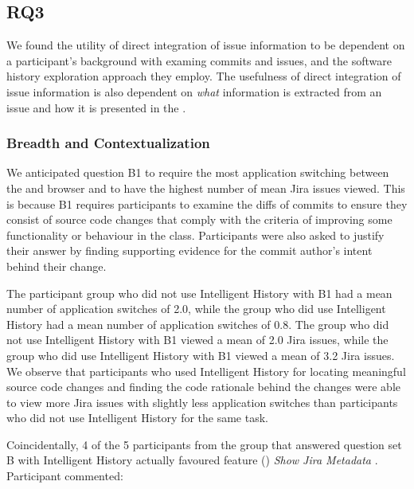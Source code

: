 
\subsection{RQ3}
\label{subsec:RQ3}


We found the utility of direct integration of issue information 
to be dependent on a participant's background with examing commits and issues,
and the software history exploration approach they employ.
The usefulness of direct integration of issue information is also dependent on 
\emph{what} information is extracted from an issue and how it is presented in the .

\subsubsection{Breadth and Contextualization}

We anticipated question B1 to require the most application switching between the  
and browser and to have the highest number of mean Jira issues viewed.
This is because B1 requires participants to examine the diffs of commits to ensure they consist of source code changes 
that comply with the criteria of improving some functionality or behaviour in the  class.
Participants were also asked to justify their answer by finding supporting evidence for the commit author's intent behind their change.

The participant group who did not use Intelligent History with B1 had a mean number of application switches of 2.0,
while the group who did use Intelligent History had a mean number of application switches of 0.8.
The group who did not use Intelligent History with B1 viewed a mean of 2.0 Jira issues,
while the group who did use Intelligent History with B1 viewed a mean of 3.2 Jira issues.
We observe that participants who used Intelligent History for locating meaningful source code changes and finding the code rationale behind the changes
were able to view more Jira issues with slightly less application switches than participants who did not use Intelligent History for the same task.

Coincidentally, 4 of the 5 participants from the group that answered question set B with 
Intelligent History actually favoured feature () \textit{Show Jira Metadata} .
Participant  commented:

